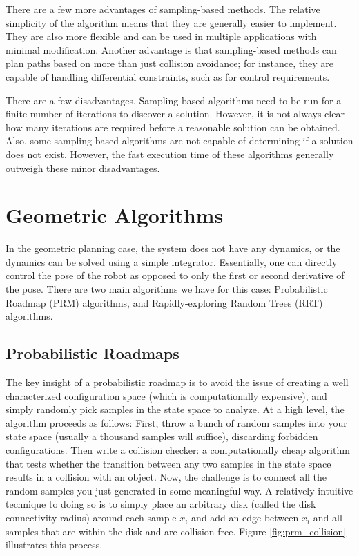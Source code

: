\documentclass[twoside]{article}
\begin{document}
There are a few more advantages of sampling-based methods. The relative simplicity of the algorithm means that they are generally easier to implement. They are also more flexible and can be used in multiple applications with minimal modification. Another advantage is that sampling-based methods can plan paths based on more than just collision avoidance; for instance, they are capable of handling differential constraints, such as for control requirements.

There are a few disadvantages. Sampling-based algorithms need to be run for a finite number of iterations to discover a solution. However, it is not always clear how many iterations are required before a reasonable solution can be obtained. Also, some sampling-based algorithms are not capable of determining if a solution does not exist. However, the fast execution time of these algorithms generally outweigh these minor disadvantages.

\section{Geometric Algorithms}
In the geometric planning case, the system does not have any dynamics, or the dynamics can be solved using a simple integrator. Essentially, one can directly control the pose of the robot as opposed to only the first or second derivative of the pose. There are two main algorithms we have for this case: Probabilistic Roadmap (PRM) algorithms, and Rapidly-exploring Random Trees (RRT) algorithms.

\subsection{Probabilistic Roadmaps}
The key insight of a probabilistic roadmap is to avoid the issue of creating a well characterized configuration space (which is computationally expensive), and simply randomly pick samples in the state space to analyze. At a high level, the algorithm proceeds as follows: First, throw a bunch of random samples into your state space (usually a thousand samples will suffice), discarding forbidden configurations. Then write a collision checker: a computationally cheap algorithm that tests whether the transition between any two samples in the state space results in a collision with an object. Now, the challenge is to connect all the random samples you just generated in some meaningful way. A relatively intuitive technique to doing so is to simply place an arbitrary disk (called the disk connectivity radius) around each sample $x_i$ and add an edge between $x_i$ and all samples that are within the disk and are collision-free. Figure \ref{fig:prm_collision} illustrates this process.
\end{document}
